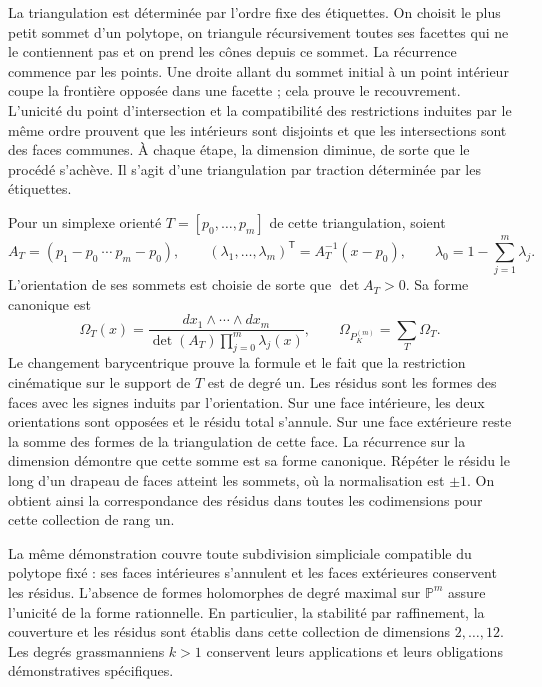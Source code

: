 La triangulation est déterminée par l’ordre fixe des étiquettes. On choisit
le plus petit sommet d’un polytope, on triangule récursivement toutes ses
facettes qui ne le contiennent pas et on prend les cônes depuis ce sommet. La
récurrence commence par les points. Une droite allant du sommet initial
à un point intérieur coupe la frontière opposée dans une facette ; cela
prouve le recouvrement. L’unicité du point d’intersection et la
compatibilité des restrictions induites par le même ordre prouvent
que les intérieurs sont disjoints et que les intersections sont des faces
communes. À chaque étape, la dimension diminue, de sorte que le procédé
s’achève. Il s’agit d’une triangulation par traction déterminée par les
étiquettes.

Pour un simplexe orienté \(T=[p_0,\ldots,p_m]\) de cette triangulation, soient
\[
 A_T=(p_1-p_0\ \cdots\ p_m-p_0),\qquad
 (\lambda_1,\ldots,\lambda_m)^\mathsf T=A_T^{-1}(x-p_0),
 \qquad\lambda_0=1-\sum_{j=1}^m\lambda_j.
\]
L’orientation de ses sommets est choisie de sorte que \(\det A_T>0\).
Sa forme canonique est
\begin{equation}
 \Omega_T(x)=
 \frac{dx_1\wedge\cdots\wedge dx_m}
 {\det(A_T)\prod_{j=0}^m\lambda_j(x)},\qquad
 \Omega_{P_K^{(m)}}=\sum_{T}\Omega_T.
 \label{eq:polygon-higher-form}
\end{equation}
Le changement barycentrique prouve la formule et le fait que la restriction cinématique sur le support de \(T\) est de degré un. Les résidus sont les formes des faces avec les signes induits par l'orientation. Sur une face intérieure, les deux orientations sont opposées et le résidu total s'annule. Sur une face extérieure reste la somme des formes de la triangulation de cette face. La récurrence sur la dimension démontre que cette somme est sa forme canonique. Répéter le résidu le long d'un drapeau de faces atteint les sommets, où la normalisation est \(\pm1\). On obtient ainsi la correspondance des résidus dans toutes les codimensions pour cette collection de rang un.

La même démonstration couvre toute subdivision simpliciale compatible du polytope fixé : ses faces intérieures s'annulent et les faces extérieures conservent les résidus. L'absence de formes holomorphes de degré maximal sur \(\mathbb P^m\) assure l'unicité de la forme rationnelle. En particulier, la stabilité par raffinement, la couverture et les résidus sont établis dans cette collection de dimensions \(2,\ldots,12\). Les degrés grassmanniens \(k>1\) conservent leurs applications et leurs obligations démonstratives spécifiques.
